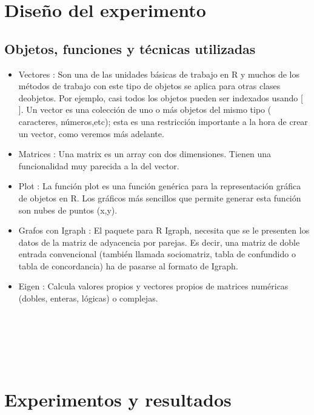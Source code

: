 \documentclass[twocolumn]{article}
\begin{document}
\section{Diseño del experimento}
\subsection{Objetos, funciones y técnicas utilizadas}
\begin{itemize}
	\item
	Vectores : Son una de las unidades básicas de trabajo en R y muchos de los métodos de trabajo con este tipo de objetos se aplica para otras clases deobjetos. Por ejemplo, casi todos los objetos pueden ser indexados usando [ ].
	Un vector es una colección de uno o más objetos del mismo tipo (
caracteres, números,etc); esta es una restricción importante a la hora de crear un vector, como veremos más adelante.
	\item
	Matrices : Una matrix es un array con dos dimensiones. Tienen una
funcionalidad muy parecida a la del vector.
	\item
    Plot  : La función plot es una función genérica para la representación gráfica de objetos en R. Los gráficos más sencillos que permite generar esta función son nubes de puntos (x,y).
    \item 
    Grafos con Igraph : El paquete para R Igraph, necesita que se le presenten los datos de la matriz de adyacencia por parejas. Es decir, una matriz de doble entrada convencional (también llamada sociomatriz, tabla de confundido o tabla de concordancia) ha de pasarse al formato de Igraph.
    \item
    Eigen : Calcula valores propios y vectores propios de matrices numéricas (dobles, enteras, lógicas) o complejas.\\ \\ \\ \\ \\ \\
	\end{itemize}	
\section{Experimentos y resultados}
\end{document}
